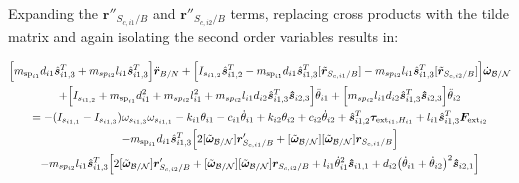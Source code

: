 \documentclass[paper]{aiaaNew}
\begin{document}
Expanding the $\bm{r}''_{S_{c,i1}/B}$ and $\bm{r}''_{S_{c,i2}/B}$ terms, replacing cross products with the tilde matrix and again isolating the second order variables results in: 

\begin{multline}
\Big[m_{\text{sp}_{i1}} d_{i1} \hat{\bm s}_{i1,3}^T + m_{sp_{i2}} l_{i1} \hat{\bm s}_{i1,3}^T \Big] \ddot{\bm{r}}_{B/N} + \Big[I_{s_{i1,2}} \hat{\bm s}_{i1,2}^T - m_{\text{sp}_{i1}} d_{i1} \hat{\bm s}_{i1,3}^T [\tilde{\bm{r}}_{S_{c,i1}/B}] - m_{sp_{i2}} l_{i1} \hat{\bm s}_{i1,3}^T [\tilde{\bm{r}}_{S_{c,i2}/B}] \Big]\dot{\bm\omega}_{\cal B/N} \\
+ \Big[I_{s_{i1,2}}+ m_{\text{sp}_{i1}} d_{i1}^2 + m_{sp_{i2}} l_{i1}^2 + m_{sp_{i2}} l_{i1} d_{i2} \hat{\bm s}_{i1,3}^T \bm{\hat{s}}_{i2,3} \Big] \ddot\theta_{i1} + \Big[m_{sp_{i2}} l_{i1} d_{i2} \hat{\bm s}_{i1,3}^T \bm{\hat{s}}_{i2,3} \Big] \ddot{\theta}_{i2}\\
= - (I_{s_{i1,1}} - I_{s_{i1,3}}) \omega_{s_{i1,3}} \omega_{s_{i1,1}} - k_{i1} \theta_{i1} - c_{i1}\dot{\theta}_{i1} 
+  k_{i2} \theta_{i2} + c_{i2} \dot\theta_{i2} 
+ \hat{\bm s}_{i1,2}^T \bm \tau_{\text{ext}_{i1},H_{i1}} + l_{i1} \hat{\bm s}_{i1,3}^T \bm F_{\text{ext}_{i2}}\\ 
- m_{\text{sp}_{i1}} d_{i1} \hat{\bm s}_{i1,3}^T \Big[2 [\tilde{\bm\omega}_{\cal B/N}] \bm{r}'_{S_{c,i1}/B}
+ [\tilde{\bm\omega}_{\cal B/N}] [\tilde{\bm\omega}_{\cal B/N}] \bm{r}_{S_{c,i1}/B}\Big]
\\
- m_{sp_{i2}} l_{i1} \hat{\bm s}_{i1,3}^T \Big[ 2 [\tilde{\bm\omega}_{\cal B/N}] \bm{r}'_{S_{c,i2}/B} 
+ [\tilde{\bm\omega}_{\cal B/N}] [\tilde{\bm\omega}_{\cal B/N}] \bm{r}_{S_{c,i2}/B} + l_{i1} \dot{\theta}_{i1}^2 \bm{\hat{s}}_{i1,1} + d_{i2}\big(\dot{\theta}_{i1} + \dot{\theta}_{i2}\big)^2\bm{\hat{s}}_{i2,1}\Big]
\label{eq:solar_panel_final10}
\end{multline}
\end{document}
